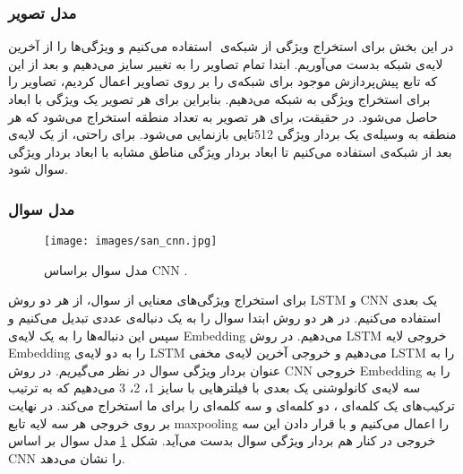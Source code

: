 {{		\subsubsection{مدل تصویر}
		{
			در این بخش برای استخراج ویژگی از شبکه‌ی
			 ‌ استفاده می‌کنیم و ویژگی‌ها را از آخرین لایه‌ی
			  ‌شبکه بدست می‌آوریم. ابتدا تمام تصاویر را به
			  تغییر سایز می‌دهیم و بعد از این که تابع پیش‌پردازش موجود برای شبکه‌ی 
			   را بر روی تصاویر اعمال کردیم، تصاویر را برای استخراج ویژگی به شبکه می‌دهیم. بنابراین برای هر تصویر یک ویژگی با ابعاد
			 حاصل می‌شود. در حقیقت، برای هر تصویر به تعداد
			 منطقه استخراج می‌شود که هر منطقه به وسیله‌ی یک بردار ویژگی 512تایی بازنمایی می‌شود. برای راحتی، از یک لایه‌ی
			 بعد از شبکه‌ی 
			استفاده می‌کنیم تا ابعاد بردار ویژگی مناطق مشابه با ابعاد بردار ویژگی سوال شود.
		}
	
		\subsubsection{مدل سوال}
		{
			\begin{figure}
				\centering
				\texttt{[image: images/san\_cnn.jpg]}
				\caption{مدل سوال براساس CNN .}
				\label{fig:2}
			\end{figure}
			برای استخراج ویژگی‌های معنایی از سوال، از هر دو روش  LSTM‌ و CNN یک بعدی استفاده می‌کنیم. در هر دو روش ابتدا سوال را به یک دنباله‌ی عددی تبدیل می‌کنیم و سپس این دنباله‌ها را به یک لایه‌ی Embedding‌ می‌دهیم. در روش
			 LSTM
			خروجی لایه Embedding را به دو لایه‌ی LSTM می‌دهیم و خروجی آخرین لایه‌ی مخفی LSTM را به عنوان بردار ویژگی سوال در نظر می‌گیریم. در روش CNN خروجی Embedding را به سه لایه‌ی کانولوشنی یک بعدی با فیلترهایی با سایز 1، 2، 3 می‌دهیم که به ترتیب ترکیب‌های یک کلمه‌ای ، دو کلمه‌ای و سه کلمه‌ای را برای ما استخراج می‌کند. در نهایت بر روی خروجی هر سه لایه تابع maxpooling  را اعمال می‌کنیم و با قرار دادن این سه خروجی در کنار هم بردار ویژگی سوال بدست می‌آید. شکل 
			\ref{fig:2}
			مدل سوال بر اساس CNN را نشان می‌دهد.
		}
	
}}
